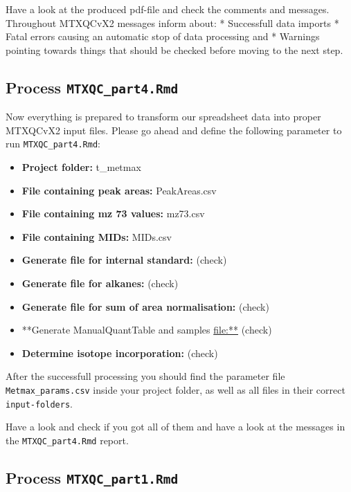 \documentclass[]{book}
\providecommand{\tightlist}{%
  \setlength{\itemsep}{0pt}\setlength{\parskip}{0pt}}
\theoremstyle{definition}
\theoremstyle{definition}
\theoremstyle{definition}
\theoremstyle{remark}
\begin{document}
Have a look at the produced pdf-file and check the comments and
messages. Throughout MTXQCvX2 messages inform about: * Successfull data
imports * Fatal errors causing an automatic stop of data processing and
* Warnings pointing towards things that should be checked before moving
to the next step.

\subsection{\texorpdfstring{Process
\texttt{MTXQC\_part4.Rmd}}{Process MTXQC\_part4.Rmd}}\label{process-mtxqc_part4.rmd}

Now everything is prepared to transform our spreadsheet data into proper
MTXQCvX2 input files. Please go ahead and define the following parameter
to run \texttt{MTXQC\_part4.Rmd}:

\begin{itemize}
\tightlist
\item
  \textbf{Project folder:} t\_metmax
\item
  \textbf{File containing peak areas:} PeakAreas.csv
\item
  \textbf{File containing mz 73 values:} mz73.csv
\item
  \textbf{File containing MIDs:} MIDs.csv
\item
  \textbf{Generate file for internal standard:} (check)
\item
  \textbf{Generate file for alkanes:} (check)
\item
  \textbf{Generate file for sum of area normalisation:} (check)
\item
  **Generate ManualQuantTable and samples \url{file:**} (check)
\item
  \textbf{Determine isotope incorporation:} (check)
\end{itemize}

After the successfull processing you should find the parameter file
\texttt{Metmax\_params.csv} inside your project folder, as well as all
files in their correct \texttt{input-folders}.

Have a look and check if you got all of them and have a look at the
messages in the \texttt{MTXQC\_part4.Rmd} report.

\subsection{\texorpdfstring{Process
\texttt{MTXQC\_part1.Rmd}}{Process MTXQC\_part1.Rmd}}\label{process-mtxqc_part1.rmd-1}
\end{document}
